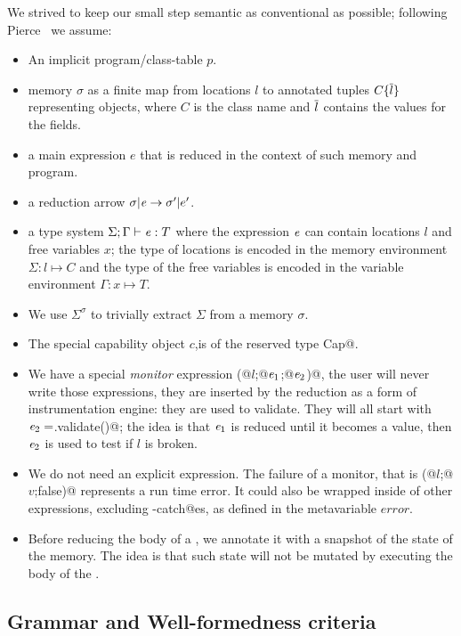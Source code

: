 \noindent We strived to keep our small step semantic as conventional as possible; following Pierce~\cite{pierce2002types} we assume:
\begin{itemize}
\item An implicit program/class-table $p$.
\item memory $\sigma$ as a finite map from locations $l$ to annotated tuples $C\{\hspace{0.03ex} \overline{\hspace{-0.03ex}l\hspace{-0.03ex}} \hspace{0.03ex}\}$ representing objects,
where $C$ is the class name and $\hspace{0.03ex} \overline{\hspace{-0.03ex}l\hspace{-0.03ex}} \hspace{0.03ex}$ contains the values for the fields.
\item a main expression $e$ that is reduced in the context of such memory and program.
\item a reduction arrow $\sigma|\e\rightarrow \sigma'|e'$.
\item a type system $\Sigma;\Gamma\vdash\e:T$ where 
the expression ${\mathit{e}}$ can contain locations $l$ and free variables $x$;
the type of locations is encoded in the memory environment $\Sigma: l\mapsto C$
and the type of the free variables is encoded in the variable environment $\Gamma: x\mapsto T$.
\item We use $\Sigma^\sigma$ to trivially extract $\Sigma$ from a memory $\sigma$.
\item The special capability object $c$,is of the reserved type
\Q@mut Cap@.
\item We have a special \emph{monitor} expression \Q@M(@$l$\Q@;@${\mathit{e}}_1$\Q@;@${\mathit{e}}_2$\Q@)@,
the user will never write those expressions, they are inserted by the reduction as
a form of instrumentation engine: they are used to validate.
They will all start with ${\mathit{e}}_2=$\Q@l.validate()@;
the idea is that ${\mathit{e}}_1$ is reduced until it becomes a value, then
${\mathit{e}}_2$ is used to test if $l$ is broken.
\item We do not need an explicit \Q@error@  expression.
The failure of a monitor, that is 
\Q@M(@$l$\Q@;@$v$\Q@;false)@ represents a run time error. It could also be wrapped inside
of other expressions, excluding \Q@try-catch@es, as defined in the metavariable $\mathit{error}$.
\item Before reducing the body of a \Q@try@, we annotate it with a snapshot of 
the state of the memory. The idea is that such state will not be mutated by executing
the body of the \Q@try@.

\end{itemize}

\subsection{Grammar and Well-formedness criteria}

